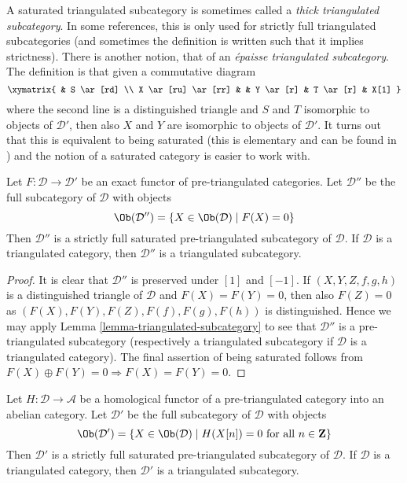 \noindent
A saturated triangulated subcategory is sometimes called a
{\it thick triangulated subcategory}. In some references, this is
only used for strictly full triangulated subcategories (and sometimes
the definition is written such that it implies strictness).
There is another notion, that of an {\it \'epaisse triangulated
subcategory}. The definition is that given a commutative diagram
$$
\xymatrix{
& S \ar[rd] \\
X \ar[ru] \ar[rr] & & Y \ar[r] & T \ar[r] & X[1]
}
$$
where the second line is a distinguished triangle and $S$ and $T$ isomorphic
to objects of $\mathcal{D}'$, then also $X$ and $Y$ are isomorphic to objects
of $\mathcal{D}'$. It turns out that this is equivalent to being
saturated (this is elementary and can be found in \cite{Rickard-derived})
and the notion of a saturated category is easier to work with.

\begin{lemma}
\label{lemma-triangle-functor-kernel}
Let $F : \mathcal{D} \to \mathcal{D}'$ be an exact functor of
pre-triangulated categories. Let $\mathcal{D}''$ be the full subcategory
of $\mathcal{D}$ with objects
$$
\Ob(\mathcal{D}'') =
\{X \in \Ob(\mathcal{D}) \mid F(X) = 0\}
$$
Then $\mathcal{D}''$ is a strictly full saturated pre-triangulated
subcategory of $\mathcal{D}$. If $\mathcal{D}$ is a triangulated category,
then $\mathcal{D}''$ is a triangulated subcategory.
\end{lemma}

\begin{proof}
It is clear that $\mathcal{D}''$ is preserved under $[1]$ and $[-1]$.
If $(X, Y, Z, f, g, h)$ is a distinguished triangle of $\mathcal{D}$
and $F(X) = F(Y) = 0$, then also $F(Z) = 0$ as
$(F(X), F(Y), F(Z), F(f), F(g), F(h))$ is distinguished.
Hence we may apply
Lemma \ref{lemma-triangulated-subcategory}
to see that $\mathcal{D}''$ is a pre-triangulated subcategory (respectively
a triangulated subcategory if $\mathcal{D}$ is a triangulated category).
The final assertion of being saturated follows from
$F(X) \oplus F(Y) = 0 \Rightarrow F(X) = F(Y) = 0$.
\end{proof}

\begin{lemma}
\label{lemma-homological-functor-kernel}
Let $H : \mathcal{D} \to \mathcal{A}$ be a homological functor of
a pre-triangulated category into an abelian category.
Let $\mathcal{D}'$ be the full subcategory of $\mathcal{D}$ with objects
$$
\Ob(\mathcal{D}') =
\{X \in \Ob(\mathcal{D}) \mid
H(X[n]) = 0\text{ for all }n \in \mathbf{Z}\}
$$
Then $\mathcal{D}'$ is a strictly full saturated pre-triangulated subcategory
of $\mathcal{D}$. If $\mathcal{D}$ is a triangulated category, then
$\mathcal{D}'$ is a triangulated subcategory.
\end{lemma}


